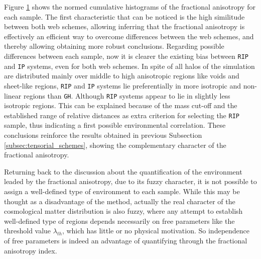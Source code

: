 \documentclass[a4,useAMS,usenatbib,usegraphicx]{latex/mn2e}
\begin{document}
\begin{flushleft}
\begin{figure}
\begin{center}

  \label{fig:fractional_anisotropy}
  \vspace{0.1 cm}

\end{center}
\end{figure}
\end{flushleft}



Figure \ref{fig:fractional_anisotropy} shows the normed cumulative 
histograms of the fractional anisotropy for each sample. The first 
characteristic that can be noticed is the high similitude between both web
schemes, allowing inferring that the fractional anisotropy is effectively
an efficient way to overcome differences between the web schemes, and 
thereby allowing obtaining more robust conclusions. Regarding possible 
differences between each sample, now it is clearer the existing bias 
between \texttt{RIP} and \texttt{IP} systems, even for both web schemes. 
In spite of all halos of the simulation are distributed mainly over middle 
to high anisotropic regions like voids and sheet-like regions, 
\texttt{RIP} and \texttt{IP} systems lie preferentially in more isotropic 
and non-linear regions than \texttt{GH}. Although \texttt{RIP} systems 
appear to lie in slightly less isotropic regions. This can be explained 
because of the mass cut-off and the established range of relative 
distances as extra criterion for selecting the \texttt{RIP} sample, thus 
indicating a first possible environmental correlation. These conclusions 
reinforce the results obtained in previous Subsection 
\ref{subsec:tensorial_schemes}, showing the complementary character of the 
fractional anisotropy. 



Returning back to the discussion about the quantification of the 
environment leaded by the fractional anisotropy, due to its fuzzy 
character, it is not possible to assign a well-defined type of environment 
to each sample. While this may be thought as a disadvantage of the method, 
actually the real character of the cosmological matter distribution is 
also fuzzy, where any attempt to establish well-defined type of regions 
depends necessarily on free parameters like the threshold value 
$\lambda_{th}$, which has little or no physical motivation. So 
independence of free parameters is indeed an advantage of quantifying 
through the fractional anisotropy index.
\end{document}
